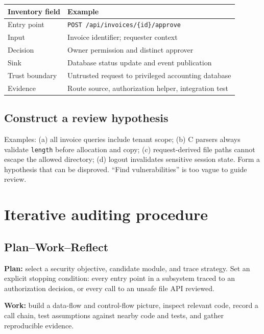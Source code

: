 \documentclass[
  letterpaper,
]{article}
\begin{document}
\begin{longtable}[]{@{}ll@{}}
\toprule\noalign{}
Inventory field & Example \\
\midrule\noalign{}
\endhead
\bottomrule\noalign{}
\endlastfoot
Entry point & \texttt{POST\ /api/invoices/\{id\}/approve} \\
Input & Invoice identifier; requester context \\
Decision & Owner permission and distinct approver \\
Sink & Database status update and event publication \\
Trust boundary & Untrusted request to privileged accounting database \\
Evidence & Route source, authorization helper, integration test \\
\end{longtable}

\subsection{Construct a review
hypothesis}\label{construct-a-review-hypothesis}

Examples: (a) all invoice queries include tenant scope; (b) C parsers
always validate \texttt{length} before allocation and copy; (c)
request-derived file paths cannot escape the allowed directory; (d)
logout invalidates sensitive session state. Form a hypothesis that can
be disproved. ``Find vulnerabilities'' is too vague to guide review.

\section{Iterative auditing
procedure}\label{iterative-auditing-procedure}

\subsection{Plan--Work--Reflect}\label{planworkreflect}

\textbf{Plan:} select a security objective, candidate module, and trace
strategy. Set an explicit stopping condition: every entry point in a
subsystem traced to an authorization decision, or every call to an
unsafe file API reviewed.

\textbf{Work:} build a data-flow and control-flow picture, inspect
relevant code, record a call chain, test assumptions against nearby code
and tests, and gather reproducible evidence.
\end{document}
